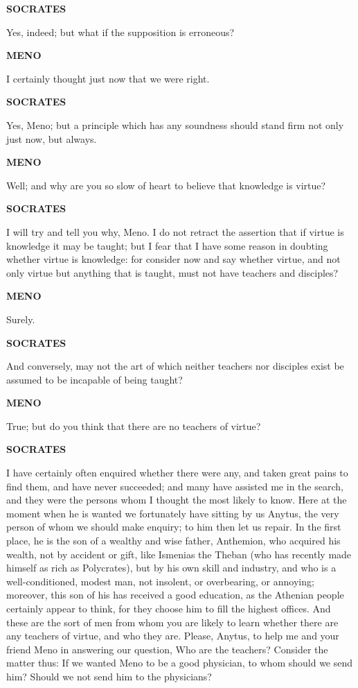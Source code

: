 \documentclass[11pt,letter]{article}
\begin{document}
\par \textbf{SOCRATES}
\par   Yes, indeed; but what if the supposition is erroneous?

\par \textbf{MENO}
\par   I certainly thought just now that we were right.

\par \textbf{SOCRATES}
\par   Yes, Meno; but a principle which has any soundness should stand firm not only just now, but always.

\par \textbf{MENO}
\par   Well; and why are you so slow of heart to believe that knowledge is virtue?

\par \textbf{SOCRATES}
\par   I will try and tell you why, Meno. I do not retract the assertion that if virtue is knowledge it may be taught; but I fear that I have some reason in doubting whether virtue is knowledge:  for consider now and say whether virtue, and not only virtue but anything that is taught, must not have teachers and disciples?

\par \textbf{MENO}
\par   Surely.

\par \textbf{SOCRATES}
\par   And conversely, may not the art of which neither teachers nor disciples exist be assumed to be incapable of being taught?

\par \textbf{MENO}
\par   True; but do you think that there are no teachers of virtue?

\par \textbf{SOCRATES}
\par   I have certainly often enquired whether there were any, and taken great pains to find them, and have never succeeded; and many have assisted me in the search, and they were the persons whom I thought the most likely to know. Here at the moment when he is wanted we fortunately have sitting by us Anytus, the very person of whom we should make enquiry; to him then let us repair. In the first place, he is the son of a wealthy and wise father, Anthemion, who acquired his wealth, not by accident or gift, like Ismenias the Theban (who has recently made himself as rich as Polycrates), but by his own skill and industry, and who is a well-conditioned, modest man, not insolent, or overbearing, or annoying; moreover, this son of his has received a good education, as the Athenian people certainly appear to think, for they choose him to fill the highest offices. And these are the sort of men from whom you are likely to learn whether there are any teachers of virtue, and who they are. Please, Anytus, to help me and your friend Meno in answering our question, Who are the teachers? Consider the matter thus:  If we wanted Meno to be a good physician, to whom should we send him? Should we not send him to the physicians?
\end{document}

